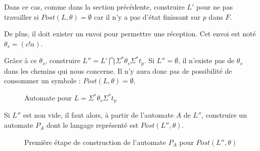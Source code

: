 Dans ce cas, comme dans la section précédente, construire $L'$ pour ne pas travailler si $Post(L,\theta)=\emptyset$ car il n'y a pas d'état finissant sur $p$ dans $F$.

De plus, il doit exister un envoi pour permettre une réception. Cet envoi est noté $\theta_s=(c!a)$.

Grâce à ce $\theta_s$, construire $L''=L'\bigcap\Sigma^*\theta_s\Sigma^*t_p$. Si $L''=\emptyset$, il n'existe pas de $\theta_s$ dans les chemins qui nous concerne. Il n'y aura donc pas de possibilité de consommer un symbole : $Post(L,\theta)=\emptyset$. 


\begin{figure}[H]
    \centering
    \caption{Automate pour $L=\Sigma^*\theta_s\Sigma^*t_p$}\label{fig:lseconde}
\end{figure}


Si $L''$ est non vide, il faut alors, à partir de l'automate $A$ de $L''$, construire un automate $P_A$ dont le langage représenté est $Post(L'',\theta)$.

\begin{figure}[H]
    \centering
    \caption{Première étape de construction de l'automate $P_A$ pour $Post(L'',\theta)$}\label{fig:aaprime}
\end{figure}

